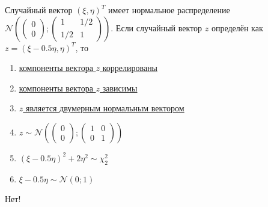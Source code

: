\documentclass[t]{beamer}
\newcommand{\cN}{\mathcal{N}}
\begin{document}
 \begin{frame} \label{27-No} 
\begin{block}{27} 

    Случайный вектор $(\xi, \eta)^T$ имеет нормальное распределение
    $\cN \left(
    \begin{pmatrix}
      0 \\
      0
    \end{pmatrix};
    \begin{pmatrix}
      1 & 1/2 \\
      1/2 & 1
    \end{pmatrix}
  \right)$. Если случайный вектор $z$ определён как $z=(\xi - 0.5\eta, \eta)^T$, то
  


 \end{block} 
\begin{enumerate} 
\item[] \hyperlink{27-No}{\beamergotobutton{} компоненты вектора $z$ коррелированы}
\item[] \hyperlink{27-No}{\beamergotobutton{} компоненты вектора $z$ зависимы}
\item[] \hyperlink{27-Yes}{\beamergotobutton{} $z$ является двумерным нормальным вектором}
\item[] \hyperlink{27-No}{\beamergotobutton{} $z \sim \cN \left(
	\begin{pmatrix}
	0 \\
	0
	\end{pmatrix};
	\begin{pmatrix}
	1 & 0 \\
	0 & 1
	\end{pmatrix}
	\right)$}
\item[] \hyperlink{27-No}{\beamergotobutton{} $(\xi - 0.5\eta)^2 + 2\eta^2 \sim \chi_2^2$}
\item[] \hyperlink{27-No}{\beamergotobutton{} $\xi - 0.5\eta \sim \cN(0;1)$}
\end{enumerate} 

 \alert{Нет!} 
\end{frame} 
\end{document}
